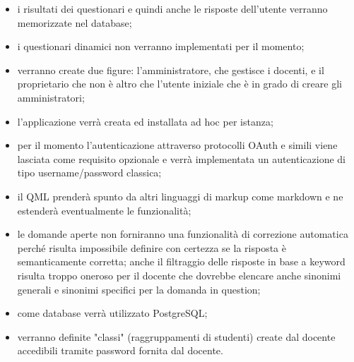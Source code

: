 \documentclass[12pt,a4paper]{article}
\begin{document}
\begin{itemize}
    \item i risultati dei questionari e quindi anche le risposte dell'utente verranno memorizzate nel
        database;
    \item i questionari dinamici non verranno implementati per il momento;
    \item verranno create due figure: l'amministratore, che gestisce i docenti, e il proprietario
        che non è altro che l'utente iniziale che è in grado di creare gli amministratori;
    \item l'applicazione verrà creata ed installata ad hoc per istanza;
    \item per il momento l'autenticazione attraverso protocolli OAuth e simili viene lasciata
        come requisito opzionale e verrà implementata un autenticazione di tipo username/password
        classica;
    \item il QML prenderà spunto da altri linguaggi di markup come markdown e ne estenderà
        eventualmente le funzionalità;
    \item le domande aperte non forniranno una funzionalità di correzione automatica perché
        risulta impossibile definire con certezza se la risposta è semanticamente corretta;
        anche il filtraggio delle risposte in base a keyword risulta troppo oneroso per
        il docente che dovrebbe elencare anche sinonimi generali e sinonimi specifici per la
        domanda in question;
    \item come database verrà utilizzato PostgreSQL;
    \item verranno definite "classi" (raggruppamenti di studenti) create dal docente
        accedibili tramite password fornita dal docente.
\end{itemize}
\end{document}
